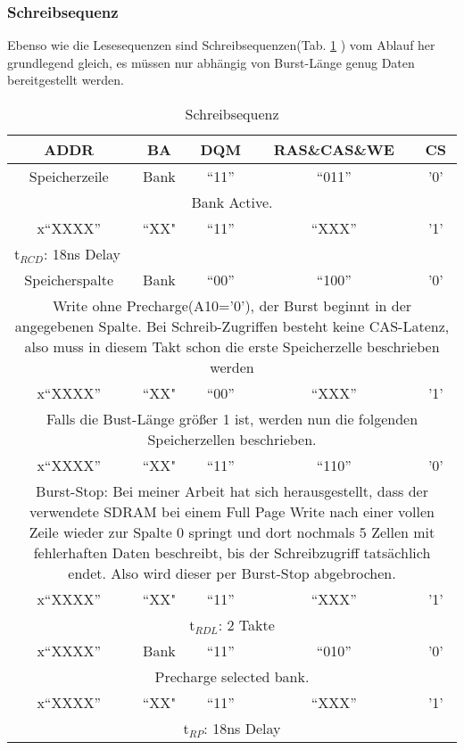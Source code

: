 \subsubsection*{Schreibsequenz}
Ebenso wie die Lesesequenzen sind Schreibsequenzen(Tab. \ref{tab:schr-seq} ) vom Ablauf her grundlegend gleich, es müssen nur abhängig von Burst-Länge genug Daten bereitgestellt werden.

\begin{table}[h!]
\caption{Schreibsequenz}
\label{tab:schr-seq}
\centering
\setlength{\tabcolsep}{1ex}
\def\arraystretch{1.20}
\setlength{\tabcolsep}{1ex}
\small
\begin{tabularx}{\textwidth}{|ccccc|}
\hline 
ADDR & BA & DQM & RAS\&CAS\&WE & CS\\ 
\hline 
Speicherzeile & Bank & ``11'' & ``011'' & '0'\\
\multicolumn{5}{|X|}{Bank Active.} \\ 
\hline 
x``XXXX'' & ``XX" & ``11'' & ``XXX'' & '1'  \\ 
\multicolumn{5}{|l|}{t$_{RCD}$: 18ns Delay} \\
\hline 
Speicherspalte & Bank & ``00'' & ``100'' & '0' \\
\multicolumn{5}{|X|}{Write ohne Precharge(A10='0'), der Burst beginnt in der angegebenen Spalte. Bei Schreib-Zugriffen besteht keine CAS-Latenz, also muss in diesem Takt schon die erste Speicherzelle beschrieben werden} \\ 
\hline 
x``XXXX'' & ``XX" & ``00'' & ``XXX'' & '1'\\ 
\multicolumn{5}{|X|}{Falls die Bust-Länge größer 1 ist, werden nun die folgenden Speicherzellen beschrieben.} \\
\hline 
x``XXXX'' & ``XX" & ``11'' & ``110'' & '0'\\ 
\multicolumn{5}{|X|}{Burst-Stop: Bei meiner Arbeit hat sich herausgestellt, dass der verwendete SDRAM bei einem Full Page Write nach einer vollen Zeile wieder zur Spalte 0 springt und dort nochmals 5 Zellen mit fehlerhaften Daten beschreibt, bis der Schreibzugriff tatsächlich endet. Also wird dieser per Burst-Stop abgebrochen.} \\
\hline 
x``XXXX'' & ``XX" & ``11'' & ``XXX'' & '1'\\ 
\multicolumn{5}{|X|}{t$_{RDL}$: 2 Takte} \\
\hline 
x``XXXX'' & Bank & ``11'' & ``010'' & '0'\\ 
\multicolumn{5}{|X|}{Precharge selected bank.} \\
\hline 
x``XXXX'' & ``XX" & ``11'' & ``XXX'' & '1'\\ 
\multicolumn{5}{|X|}{t$_{RP}$: 18ns Delay} \\
\hline 
\end{tabularx} 
\end{table}
\FloatBarrier

